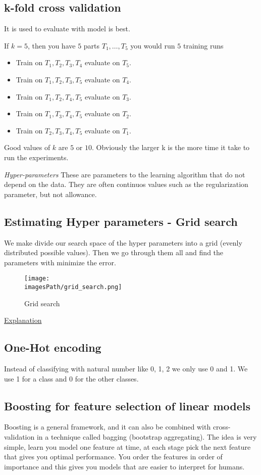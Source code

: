 \subsection{k-fold cross validation}
It is used to evaluate with model is best.

If $k = 5$, then you have $5$ parts $T_1,\ldots,T_5$ you would run $5$ training runs
\begin{itemize}
    \item Train on $T_1, T_2, T_3, T_4$ evaluate on $T_5$.
    \item Train on $T_1, T_2, T_3, T_5$ evaluate on $T_4$.
    \item Train on $T_1, T_2, T_4, T_5$ evaluate on $T_3$.
    \item Train on $T_1, T_3, T_4, T_5$ evaluate on $T_2$.
    \item Train on $T_2, T_3, T_4, T_5$ evaluate on $T_1$.
\end{itemize}
Good values of $k$ are $5$ or $10$. Obviously the larger k is the more time it take to run the experiments.

\textit{Hyper-parameters} \newline
These are parameters to the learning algorithm that do not depend on the data.
They are often continuos values such as the regularization parameter, but not allowance.

\subsection{Estimating Hyper parameters - Grid search}
We make divide our search space of the hyper parameters into a grid (evenly distributed possible values).
Then we go through them all and find the parameters with minimize the error.
\begin{figure}[!h]
    \centering
    \texttt{[image: \\imagesPath/grid\_search.png]}
    \caption{Grid search}
\end{figure}
\href{https://www.youtube.com/watch?v=ttE0F7fghfk}{Explanation}


\subsection{One-Hot encoding}
Instead of classifying with natural number like 0, 1, 2 we only 
use 0 and 1. We use 1 for a class and 0 for the other classes.

\subsection{Boosting for feature selection of linear models}
Boosting is a general framework, and it can also be combined with
cross-validation in a technique called bagging (bootstrap aggregating).
The idea is very simple, learn you model one feature at time, at each stage
pick the next feature that gives you optimal performance.
You order the features in order of importance and this gives you models
that are easier to interpret for humans.

